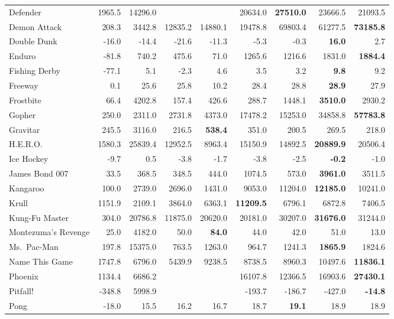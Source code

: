 \documentclass[a4paper]{article}
\begin{document}
\begin{table*}[p]
{{\begin{tabular}{|l|rr|rrr|rrr|}
Defender  & 1965.5 & 14296.0 &  &  & 20634.0 & \textbf{27510.0} & 23666.5 & 21093.5\\
Demon Attack  & 208.3 & 3442.8 & 12835.2 & 14880.1 & 19478.8 & 69803.4 & 61277.5 & \textbf{73185.8}\\
Double Dunk  & -16.0 & -14.4 & -21.6 & -11.3 & -5.3 & -0.3 & \textbf{16.0} & 2.7\\
Enduro  & -81.8 & 740.2 & 475.6 & 71.0 & 1265.6 & 1216.6 & 1831.0 & \textbf{1884.4}\\
Fishing Derby  & -77.1 & 5.1 & -2.3 & 4.6 & 3.5 & 3.2 & \textbf{9.8} & 9.2\\
Freeway  & 0.1 & 25.6 & 25.8 & 10.2 & 28.4 & 28.8 & \textbf{28.9} & 27.9\\
Frostbite  & 66.4 & 4202.8 & 157.4 & 426.6 & 288.7 & 1448.1 & \textbf{3510.0} & 2930.2\\
Gopher  & 250.0 & 2311.0 & 2731.8 & 4373.0 & 17478.2 & 15253.0 & 34858.8 & \textbf{57783.8}\\
Gravitar  & 245.5 & 3116.0 & 216.5 & \textbf{538.4} & 351.0 & 200.5 & 269.5 & 218.0\\
H.E.R.O.  & 1580.3 & 25839.4 & 12952.5 & 8963.4 & 15150.9 & 14892.5 & \textbf{20889.9} & 20506.4\\
Ice Hockey  & -9.7 & 0.5 & -3.8 & -1.7 & -3.8 & -2.5 & \textbf{-0.2} & -1.0\\
James Bond 007  & 33.5 & 368.5 & 348.5 & 444.0 & 1074.5 & 573.0 & \textbf{3961.0} & 3511.5\\
Kangaroo  & 100.0 & 2739.0 & 2696.0 & 1431.0 & 9053.0 & 11204.0 & \textbf{12185.0} & 10241.0\\
Krull  & 1151.9 & 2109.1 & 3864.0 & 6363.1 & \textbf{11209.5} & 6796.1 & 6872.8 & 7406.5\\
Kung-Fu Master  & 304.0 & 20786.8 & 11875.0 & 20620.0 & 20181.0 & 30207.0 & \textbf{31676.0} & 31244.0\\
Montezuma's Revenge  & 25.0 & 4182.0 & 50.0 & \textbf{84.0} & 44.0 & 42.0 & 51.0 & 13.0\\
Ms.\ Pac-Man  & 197.8 & 15375.0 & 763.5 & 1263.0 & 964.7 & 1241.3 & \textbf{1865.9} & 1824.6\\
Name This Game  & 1747.8 & 6796.0 & 5439.9 & 9238.5 & 8738.5 & 8960.3 & 10497.6 & \textbf{11836.1}\\
Phoenix  & 1134.4 & 6686.2 &  &  & 16107.8 & 12366.5 & 16903.6 & \textbf{27430.1}\\
Pitfall!  & -348.8 & 5998.9 &  &  & -193.7 & -186.7 & -427.0 & \textbf{-14.8}\\
Pong  & -18.0 & 15.5 & 16.2 & 16.7 & 18.7 & \textbf{19.1} & 18.9 & 18.9\\

\end{tabular}}}
\end{table*}
\end{document}
